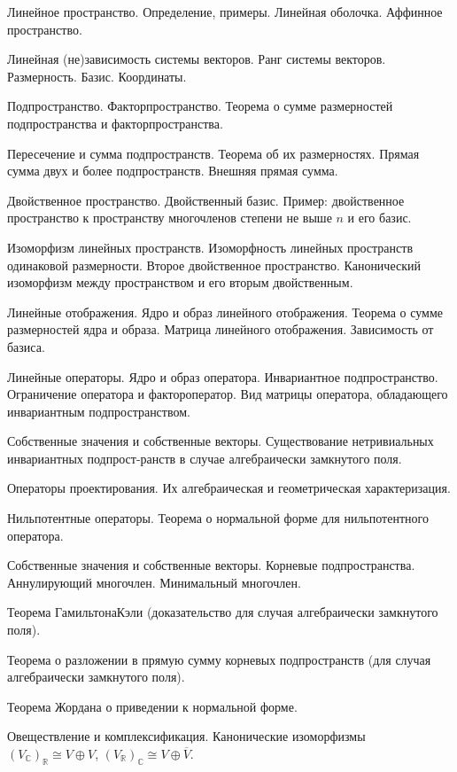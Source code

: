 \documentclass[a4paper]{article}
\begin{document}
\begin{nums}{-2}
\item Линейное пространство. Определение, примеры. Линейная
оболочка. Аффинное пространство.
\item  Линейная  (не)зависимость системы векторов. Ранг  системы
векторов.  Размерность.  Базис. Координаты.
\item Подпространство. Факторпространство.   Теорема о сумме
размерностей подпространства и факторпространства.
\item Пересечение и сумма подпространств. Теорема об их размерностях.
Прямая сумма двух и более подпространств. Внешняя прямая сумма.
\item Двойственное пространство.   Двойственный базис.   Пример:
двойственное пространство   к пространству многочленов степени не
выше $n$ и его базис.
\item  Изоморфизм линейных   пространств. Изоморфность линейных
пространств одинаковой размерности. Второе двойственное
пространство. Канонический изоморфизм между пространством и его
вторым двойственным.
\item Линейные отображения. Ядро и образ линейного отображения.
Теорема о сумме размерностей ядра и образа. Матрица линейного
отображения. Зависимость от базиса.
\item Линейные операторы. Ядро и образ оператора. Инвариантное
подпространство. Ограничение оператора   и фактор\д оператор.    Вид
матрицы оператора, обладающего инвариантным подпространством.
\item Собственные значения и собственные векторы. Существование
нетривиальных инвариантных подпрост-\break ранств в случае
алгебраически замкнутого поля.
\item Операторы проектирования. Их алгебраическая и геометрическая
характеризация.
\item  Нильпотентные операторы. Теорема о нормальной форме для
нильпотентного оператора.
\item Собственные значения и собственные векторы. Корневые
подпространства. Аннулирующий многочлен. Минимальный многочлен.
\item  Теорема Гамильтона\ч Кэли (доказательство для случая
алгебраически замкнутого поля).
\item Теорема о разложении в прямую сумму корневых подпространств
(для случая алгебраически замкнутого поля).
\item  Теорема Жордана о приведении к нормальной форме.
\item Овеществление и комплексификация. Канонические изоморфизмы
$(V_\mathbb{C})_\mathbb{R}\cong V\oplus V$,
$(V_\mathbb{R})_\mathbb{C}\cong V\oplus \overline{V}$.


\end{nums}
\end{document}
